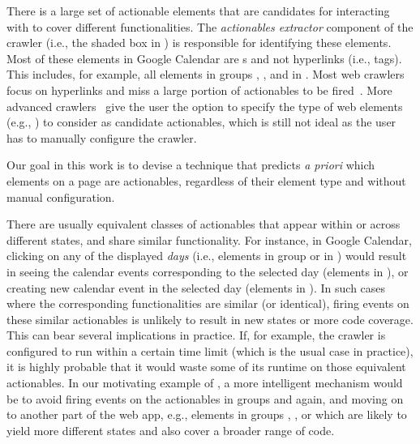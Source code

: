 
	 
	There is a large set of actionable elements that are candidates for interacting with
	to cover different functionalities.
	The \textit{actionables extractor} component of the crawler
	(i.e., the shaded box in ) is responsible for identifying these elements.
	Most of these elements in Google Calendar are s and not hyperlinks (i.e.,  tags).
	This includes, for example, all elements in groups , ,  and   in . 
	Most web crawlers focus on hyperlinks and miss a large portion of actionables to be fired~\cite{Andreasen:2017:SurveyOfDynamicAnalysis}.
	More advanced crawlers~\cite{Mesbah:2012:Crawljax} give the user the option to specify the type of web elements (e.g., ) to consider as candidate actionables, which is still not ideal as the user has to manually configure the crawler.
	
	Our goal in this work is to devise a technique that predicts \textit{a priori} which elements on a page are actionables, %
	regardless of their element type and without manual configuration.
	
	 There are usually equivalent classes of actionables
	that appear within or across different states,
	and share similar functionality.  
	For instance, in Google Calendar, clicking on any of the displayed \textit{days} 
	(i.e., elements in group  or  in )
	would result in seeing the calendar events corresponding to the selected day (elements in ),
	or creating new calendar event in the selected day (elements in ).
	In such cases where the corresponding functionalities are similar (or identical), 
	 firing events on these similar actionables is unlikely to result in new states
	or more \js code coverage.
	This can bear several implications in practice.
	If, for example, the crawler is configured to run within a certain time limit (which is the usual case in practice),
	it is highly probable that it would waste some of its runtime on those equivalent actionables. 
	In our motivating example of , 
	a more intelligent mechanism would be to 
	avoid firing events on the actionables in groups  and  again, 
	and moving on to another part of the web app,
	e.g., elements in groups , , or  
	which are likely to yield more different states and also cover a broader range of \js code.

	


